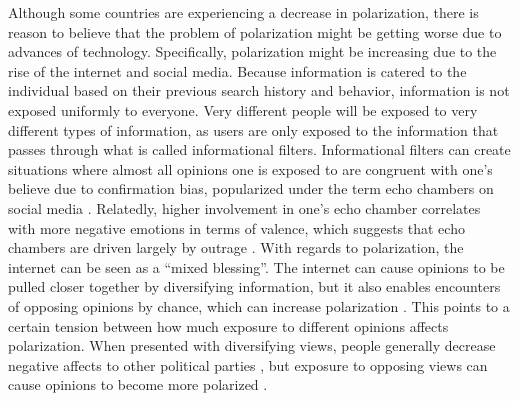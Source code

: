 \documentclass{article}
\begin{document}
Although some countries are experiencing a decrease in polarization, there is reason to believe that the problem of polarization might be getting worse due to advances of technology.
Specifically, polarization might be increasing due to the rise of the internet and social media. Because information is catered to the individual based on their previous search history and behavior, information is not exposed uniformly to everyone. Very different people will be exposed to very different types of information, as users are only exposed to the information that passes through what is called informational filters.
Informational filters can create situations where almost all opinions one is exposed to are congruent with one’s believe due to confirmation bias, popularized under the term echo chambers on social media \cite{baumann_modeling_2020, sasahara_social_2021, tsai_echo_2020}. Relatedly, higher involvement in one’s echo chamber correlates with more negative emotions in terms of valence, which suggests that echo chambers are driven largely by outrage \cite{del_vicario_echo_2016}. With regards to polarization, the internet can be seen as a “mixed blessing”. The internet can cause opinions to be pulled closer together by diversifying information, but it also enables encounters of opposing opinions by chance, which can increase polarization \cite{lev-on_happy_2009}. This points to a certain tension between how much exposure to different opinions affects polarization. When presented with diversifying views, people generally decrease negative affects to other political parties \cite{levy_social_2021}, but exposure to opposing views can cause opinions to become more polarized \cite{bail_exposure_2018}. 
\end{document}
